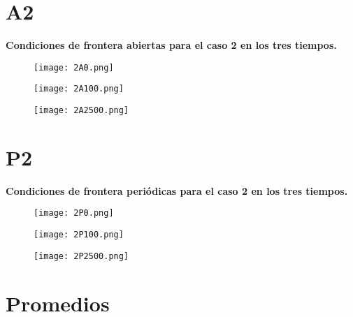 \documentclass[12pt,letterpaper]{article}
\begin{document}
\section{A2}
\vspace{0.2cm}

\begin{center}
{\textbf{Condiciones de frontera abiertas para el caso 2 en los tres tiempos.}}\\
\vspace{0.2cm}
\end{center}

\begin{figure}[H]
\texttt{[image: 2A0.png]}
\centering
\end{figure}

\begin{figure}[H]
\texttt{[image: 2A100.png]}
\centering
\end{figure}

\begin{figure}[H]
\texttt{[image: 2A2500.png]}
\centering
\end{figure}



\section{P2}
\vspace{0.2cm}

\begin{center}
{\textbf{Condiciones de frontera periódicas para el caso 2 en los tres tiempos.}}\\
\vspace{0.2cm}
\end{center}

\begin{figure}[H]
\texttt{[image: 2P0.png]}
\centering
\end{figure}

\begin{figure}[H]
\texttt{[image: 2P100.png]}
\centering
\end{figure}

\begin{figure}[H]
\texttt{[image: 2P2500.png]}
\centering
\end{figure}



\section{Promedios}
\end{document}

